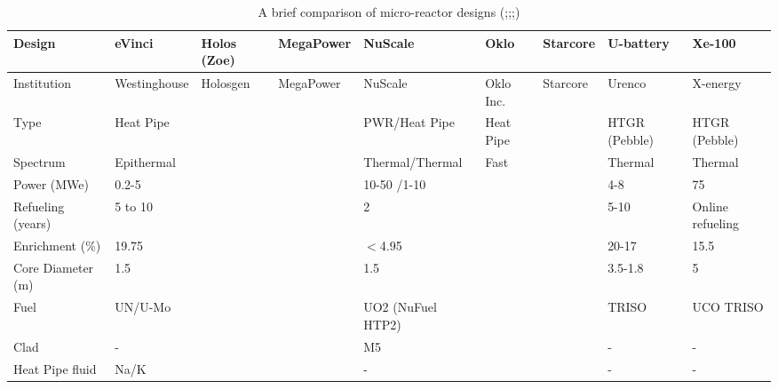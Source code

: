 \documentclass[10pt,a4paper]{article}
\begin{document}
\pagebreak
{}
\begin{landscape}
\begin{table} [ht]
\begin{center}

\caption{A brief comparison of micro-reactor designs (\cite{Yan20};\cite{Arafat19};\cite{Levinsky18};\cite{IAEA18})}
\label{microreactors}
\begin{tabular}{|l|l|l|l|l|l|l|l|l|}
\hline 
Design 		&eVinci 		& Holos (Zoe)		&MegaPower 	& NuScale		& Oklo 		& Starcore		& U-battery 		& Xe-100 \\ 
\hline 
Institution 	&Westinghouse& Holosgen	&MegaPower	& NuScale		& Oklo Inc. 	& Starcore		& Urenco 		& X-energy \\ 
Type			&Heat Pipe	&   		  	&  		& PWR/Heat Pipe&Heat Pipe   			&				& HTGR (Pebble)	& HTGR (Pebble)\\ 
Spectrum		&Epithermal	&  		 	&  	&Thermal/Thermal 		&Fast   			&   			&	Thermal		&Thermal\\ 
Power (MWe)	&0.2-5		&   			&			& 10-50 /1-10			&   			&  			&4-8			&75\\ 
Refueling (years)&5 to 10		&   			&			& 2 			&   			&  			&5-10 			&Online refueling\\ 
Enrichment (\%)&19.75		&   			&			& $<$4.95 		&   			&   			&20-17			&15.5\\ 
Core  Diameter (m)	&1.5		&   			&			& 1.5 		&   			&   			&3.5-1.8			& 5\\ 
Fuel			&UN/U-Mo	&   			&			&UO2 (NuFuel HTP2)		&   			&   			&TRISO			&UCO TRISO\\ 
Clad			&-		&   			&			& M5 		&   			&   			&-			&-\\ 
Heat Pipe fluid	&Na/K	&   			&			& - 		&   			&   			&	-		&-\\ 
\hline
\end{tabular}


\end{center}
\end{table}
\end{landscape}
\end{document}
